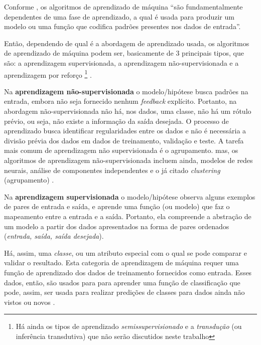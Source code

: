 Conforme , os algoritmos de aprendizado de máquina ``são fundamentalmente dependentes de uma fase de aprendizado, a qual é usada para produzir um modelo ou uma função que codifica padrões presentes nos dados de entrada''.

Então, dependendo de qual é a abordagem de aprendizado usada, os algoritmos de aprendizado de máquina podem ser, basicamente de 3 principais tipos, que são: a aprendizagem supervisionada, a aprendizagem não-supervisionada e a aprendizagem por reforço \footnote{Há ainda os tipos de aprendizado \textit{semissupervisionado} e a \textit{transdução} (ou inferência transdutiva) que não serão discutidos neste trabalho} \cite{Norvig2013} \cite{baeza-yates_recuperacao_2013}. 

Na \textbf{aprendizagem não-supervisionada} o modelo/hipótese busca padrões na entrada, embora não seja fornecido nenhum \textit{feedback} explícito. Portanto, na abordagem não-supervisionada não há, nos dados, uma classe, não há um rótulo prévio, ou seja, não existe a informação da saída desejada. O processo de aprendizado busca identificar regularidades entre os dados e não é necessária a divisão prévia dos dados em dados de treinamento, validação e teste.  A tarefa mais comum de aprendizagem não supervisionada é o agrupamento. mas, os algoritmos de aprendizagem não-supervisionada incluem ainda, modelos de redes neurais, análise de componentes independentes e o já citado \textit{clustering} (agrupamento) \cite{Norvig2013} \cite{Boscarioli2017} \cite{goldschmidt2005} \cite{aprenda_mineracao_fernando_amaral16}.

Na \textbf{aprendizagem supervisionada} o modelo/hipótese observa alguns exemplos de pares de entrada e saída, e aprende uma função (ou modelo) que faz o mapeamento entre a entrada e a saída. Portanto, ela compreende a abstração de um modelo a partir dos dados apresentados na forma de pares ordenados (\textit{entrada, saída, saída desejada}). 

Há, assim, uma \textit{classe}, ou um atributo especial com o qual se pode comparar e validar o resultado. Esta categoria de aprendizagem de máquina requer uma função de aprendizado dos dados de treinamento fornecidos como entrada. Esses dados, então, são usados para para aprender uma função de classificação que pode, assim, ser usada para realizar predições de classes para dados ainda não vistos ou novos \cite{Norvig2013} \cite{luger_inteligencia_2015} \cite{baeza-yates_recuperacao_2013}.

